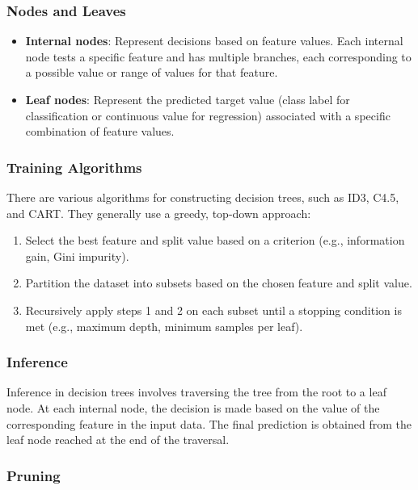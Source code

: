 \documentclass[12pt]{article}
\begin{document}
\subsubsection{Nodes and Leaves}

\begin{itemize}
\item \textbf{Internal nodes}: Represent decisions based on feature values. Each internal node tests a specific feature and has multiple branches, each corresponding to a possible value or range of values for that feature.
\item \textbf{Leaf nodes}: Represent the predicted target value (class label for classification or continuous value for regression) associated with a specific combination of feature values.
\end{itemize}

\subsubsection{Training Algorithms}

There are various algorithms for constructing decision trees, such as ID3, C4.5, and CART. They generally use a greedy, top-down approach:

\begin{enumerate}
\item Select the best feature and split value based on a criterion (e.g., information gain, Gini impurity).
\item Partition the dataset into subsets based on the chosen feature and split value.
\item Recursively apply steps 1 and 2 on each subset until a stopping condition is met (e.g., maximum depth, minimum samples per leaf).
\end{enumerate}

\subsubsection{Inference}

Inference in decision trees involves traversing the tree from the root to a leaf node. At each internal node, the decision is made based on the value of the corresponding feature in the input data. The final prediction is obtained from the leaf node reached at the end of the traversal.

\subsubsection{Pruning}
\end{document}
